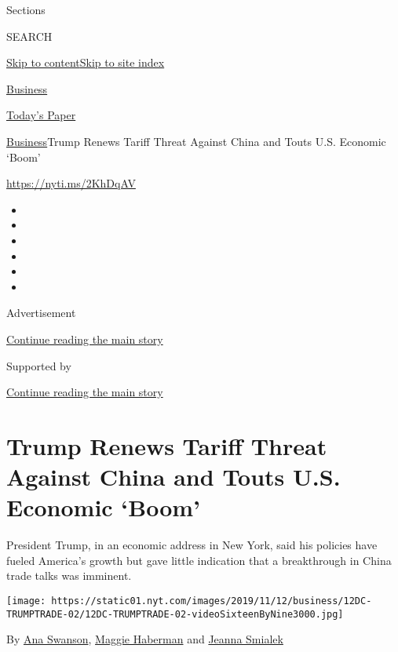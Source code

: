 Sections

SEARCH

\protect\hyperlink{site-content}{Skip to
content}\protect\hyperlink{site-index}{Skip to site index}

\href{https://www.nytimes.com/section/business}{Business}

\href{https://myaccount.nytimes.com/auth/login?response_type=cookie\&client_id=vi}{}

\href{https://www.nytimes.com/section/todayspaper}{Today's Paper}

\href{/section/business}{Business}\textbar{}Trump Renews Tariff Threat
Against China and Touts U.S. Economic `Boom'

\url{https://nyti.ms/2KhDqAV}

\begin{itemize}
\item
\item
\item
\item
\item
\item
\end{itemize}

Advertisement

\protect\hyperlink{after-top}{Continue reading the main story}

Supported by

\protect\hyperlink{after-sponsor}{Continue reading the main story}

\hypertarget{trump-renews-tariff-threat-against-china-and-touts-us-economic-boom}{%
\section{Trump Renews Tariff Threat Against China and Touts U.S.
Economic
`Boom'}\label{trump-renews-tariff-threat-against-china-and-touts-us-economic-boom}}

President Trump, in an economic address in New York, said his policies
have fueled America's growth but gave little indication that a
breakthrough in China trade talks was imminent.

\texttt{[image: https://static01.nyt.com/images/2019/11/12/business/12DC-TRUMPTRADE-02/12DC-TRUMPTRADE-02-videoSixteenByNine3000.jpg]}

By \href{https://www.nytimes.com/by/ana-swanson}{Ana Swanson},
\href{https://www.nytimes.com/by/maggie-haberman}{Maggie Haberman} and
\href{https://www.nytimes.com/by/jeanna-smialek}{Jeanna Smialek}

